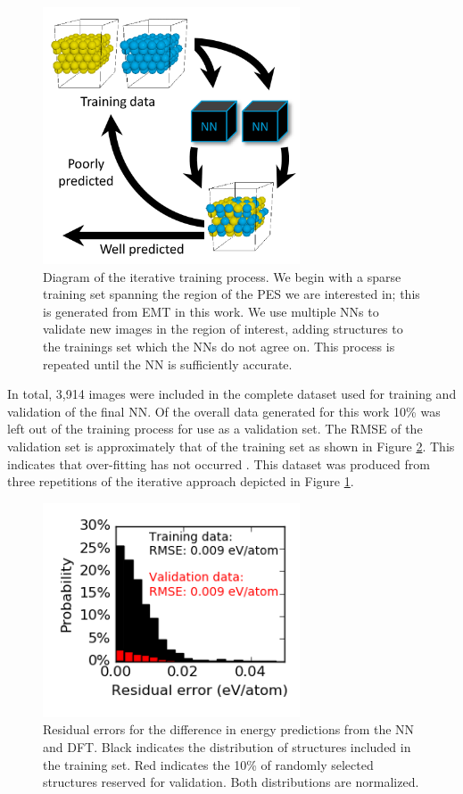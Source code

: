 \documentclass[12pt]{cmuthesis}
\begin{document}
\begin{figure}[h]
\centering
\includegraphics[width=3in]{./images/training-process.png}
\caption{\label{fig-training-process}
Diagram of the iterative training process. We begin with a sparse training set spanning the region of the PES we are interested in; this is generated from EMT in this work. We use multiple NNs to validate new images in the region of interest, adding structures to the trainings set which the NNs do not agree on. This process is repeated until the NN is sufficiently accurate.}
\end{figure}

In total, 3,914 images were included in the complete dataset used for training and validation of the final NN. Of the overall data generated for this work 10\% was left out of the training process for use as a validation set. The RMSE of the validation set is approximately that of the training set as shown in Figure \ref{fig-distribution}. This indicates that over-fitting has not occurred \cite{behler-2015-const}. This dataset was produced from three repetitions of the iterative approach depicted in Figure \ref{fig-training-process}.

\begin{figure}[h]
\centering
\includegraphics[width=3in]{./images/distribution.png}
\caption{\label{fig-distribution}
Residual errors for the  difference in energy predictions from the NN and DFT. Black indicates the distribution of structures included in the training set. Red indicates the 10\% of randomly selected structures reserved for validation. Both distributions are normalized.}
\end{figure}
\end{document}
